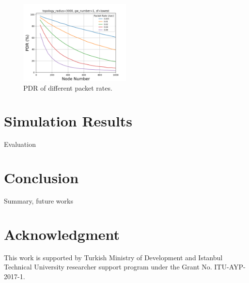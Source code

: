 \documentclass[conference]{IEEEtran}
\begin{document}
\begin{figure}
\centering
\includegraphics[width=0.5\textwidth]{pr_pdr}
\caption{PDR of different packet rates.}
\label{fig:pr_pdr}
\end{figure}


\section{Simulation Results} \label{Simulation Results}
\par [TODO] Evaluation


\section{Conclusion} \label{Conclusion}
\par [TODO] Summary, future works
\cite{7815384} \cite{7803607} \cite{7996384} \cite{8090518} \cite{s17061193} \cite{8267219} \cite{8430542} \cite{8319183} \cite{8480649} \cite{AN1200.22} \cite{Bor:2016:LLW:2988287.2989163} \cite{8406255} \cite{DBLP:journals/corr/abs-1802-10338} \cite{finnegan2018comparative}


\section*{Acknowledgment}
\par This work is supported by Turkish Ministry of Development and Istanbul Technical University researcher support program under the Grant No. ITU-AYP-2017-1.




\end{document}
